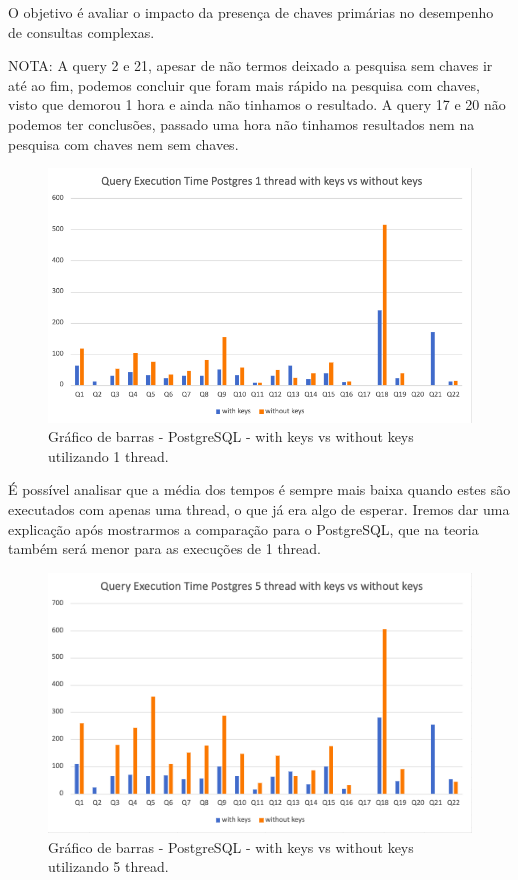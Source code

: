 \documentclass{article}
\begin{document}
O objetivo é avaliar o impacto da presença de chaves primárias no desempenho de consultas complexas.

NOTA: A query 2 e 21, apesar de não termos deixado a pesquisa sem chaves ir até ao fim, podemos concluir que foram mais rápido na pesquisa com chaves, visto que demorou 1 hora e ainda não tinhamos o resultado. A query 17 e 20 não podemos ter conclusões, passado uma hora não tinhamos resultados nem na pesquisa com chaves nem sem chaves.


\begin{figure}[H]
  \centering
  \includegraphics[width=\textwidth]{Graphs/postgres1thread_withkeysvswithoutkeys.png}
  \caption{Gráfico de barras - PostgreSQL - with keys vs without keys utilizando 1 thread.} 
  \label{fig:PKCreation2}
\end{figure}


\quad É possível analisar que a média dos tempos é sempre mais baixa quando estes são executados com apenas uma thread, o que já era algo de esperar. Iremos dar uma explicação após mostrarmos a comparação para o PostgreSQL, que na teoria também será menor para as execuções de 1 thread.

\begin{figure}[H]
  \centering
  \includegraphics[width=\textwidth]{Graphs/postgres5threads_withkeysvswithoutkeys.png}
  \caption{Gráfico de barras - PostgreSQL - with keys vs without keys utilizando 5 thread.} 
  \label{fig:PKCreation2}
\end{figure}
\clearpage
\end{document}
